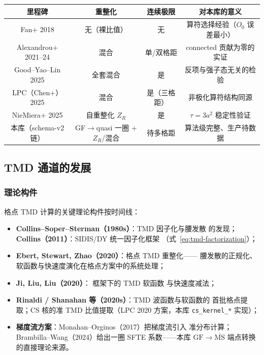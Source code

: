 \documentclass[11pt,a4paper]{ctexart}
\newcommand{\LaMET}{\text{LaMET}}
\newcommand{\MSbarM}{\overline{\text{MS}}}
\newcommand{\code}[1]{\texttt{#1}}
\newcommand{\GFr}{\mathrm{GF}}
\begin{document}
\begin{center}
\scriptsize
\begin{tabular}{c c c c}
\toprule
\textbf{里程碑} & \textbf{重整化} & \textbf{连续极限} &
\textbf{对本库的意义} \\
\midrule
Fan+ 2018 & 无（裸比值） & 无 & 算符选择经验（$O_0$ 误差最小） \\
Alexandrou+ 2021--24 & 混合 & 单/双格距 & connected 贡献为零的实证 \\
Good--Yao--Lin 2025 & 全套混合 & 是 & 反项与强子态无关的检验 \\
LPC（Chen+）2025 & 混合 & 是（三格距） & 非极化算符结构同源 \\
NieMiera+ 2025 & 自重整化 $Z_R$ & 是 & $\tau=3a^2$ 稳定性验证 \\
本库（schema-v2 链） & GF$\to$quasi 一圈 + $Z_R$/混合 & 待多格距 & 算法级完整、生产待数据 \\
\bottomrule
\end{tabular}
\end{center}

\subsection{TMD 通道的发展}

\subsubsection{理论构件}

格点 TMD 计算的关键理论构件按时间线：
\begin{itemize}
  \item \textbf{ Collins--Soper--Sterman（1980s）}：TMD 因子化与腰发散
  的发现；\textbf{Collins（2011）}：SIDIS/DY 统一因子化框架
  （式~\eqref{eq:tmd-factorization}）；
  \item \textbf{Ebert, Stewart, Zhao（2020）}：格点 TMD 重整化——
  腰发散的正规化、软函数与快速度演化在格点方案中的系统处理；
  \item \textbf{Ji, Liu, Liu（2020）}：\LaMET{} 框架下的 TMD 软函数
  与快速度减法；
  \item \textbf{Rinaldi / Shanahan 等（2020s）}：TMD 波函数与软函数的
  首批格点提取；CS 核的准 TMD 比值提取（LPC 2020 方案，本库
  \code{cs\_kernel\_*} 实现）；
  \item \textbf{梯度流方案}：Monahan--Orginos（2017）把梯度流引入
  准分布计算；Brambilla--Wang（2024）给出一圈 SFTE 系数——本库
  $\GFr\to\MSbarM$ 端点转换的直接理论来源。
\end{itemize}
\end{document}
